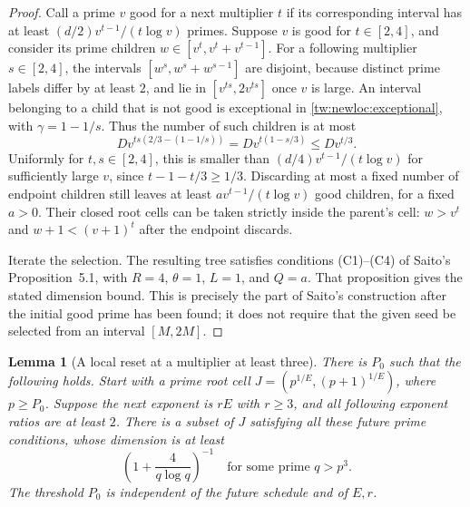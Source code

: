 \documentclass[11pt,a4paper]{article}
\newtheorem{lemma}[theorem]{Lemma}
\theoremstyle{definition}
\theoremstyle{remark}
\numberwithin{equation}{section}
\begin{document}
\begin{proof}
Call a prime $v$ good for a next multiplier $t$ if its corresponding
interval has at least $(d/2)v^{t-1}/(t\log v)$ primes. Suppose $v$ is good
for $t\in[2,4]$, and consider its prime children
$w\in[v^t,v^t+v^{t-1}]$. For a following multiplier $s\in[2,4]$, the
intervals $[w^s,w^s+w^{s-1}]$ are disjoint, because distinct prime labels
differ by at least $2$, and lie in $[v^{ts},2v^{ts}]$ once $v$ is large.
An interval belonging to a child that is not good is exceptional in
\eqref{tw:newloc:exceptional}, with $\gamma=1-1/s$. Thus the number of such
children is at most
\[
 Dv^{ts(2/3-(1-1/s))}=Dv^{t(1-s/3)}\le Dv^{t/3}.
\]
Uniformly for $t,s\in[2,4]$, this is smaller than
$(d/4)v^{t-1}/(t\log v)$ for sufficiently large $v$, since
$t-1-t/3\ge1/3$. Discarding at most a fixed number of endpoint children
still leaves at least $a v^{t-1}/(t\log v)$ good children, for a fixed
$a>0$. Their closed root cells can be taken strictly inside the parent's
cell: $w>v^t$ and $w+1<(v+1)^t$ after the endpoint discards.

Iterate the selection. The resulting tree satisfies conditions
(C1)--(C4) of Saito's Proposition~5.1, with $R=4$, $\theta=1$, $L=1$,
and $Q=a$. That proposition gives the stated dimension bound. This is
precisely the part of Saito's construction after the initial good prime
has been found; it does not require that the given seed be selected from
an interval $[M,2M]$.
\end{proof}

\begin{lemma}[A local reset at a multiplier at least three]
\label{tw:newloc:reset}
There is $P_0$ such that the following holds. Start with a prime root cell
$J=(p^{1/E},(p+1)^{1/E})$, where $p\ge P_0$. Suppose the next exponent is
$rE$ with $r\ge3$, and all following exponent ratios are at least $2$.
There is a subset of $J$ satisfying all these future prime conditions,
whose dimension is at least
\[
 \left(1+\frac{4}{q\log q}\right)^{-1}
 \quad\text{for some prime }q>p^3.
\]
The threshold $P_0$ is independent of the future schedule and of $E,r$.
\end{lemma}
\end{document}
